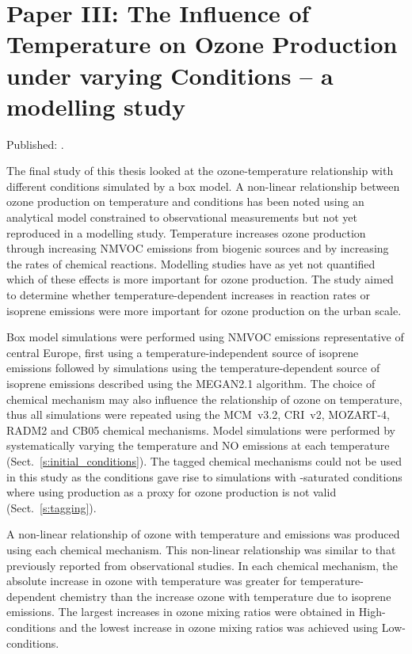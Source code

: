 \singlespacing
\section[Paper III]{Paper III: The Influence of Temperature on Ozone Production under varying  Conditions -- a modelling study} \label{s:T-O3_results}
\onehalfspacing

Published: .
\vspace{5mm}

The final study of this thesis looked at the ozone-temperature relationship with different  conditions simulated by a box model.
A non-linear relationship between ozone production on temperature and  conditions has been noted using an analytical model constrained to observational measurements but not yet reproduced in a modelling study.
Temperature increases ozone production through increasing NMVOC emissions from biogenic sources and by increasing the rates of chemical reactions.
Modelling studies have as yet not quantified which of these effects is more important for ozone production.
The study aimed to determine whether temperature-dependent increases in reaction rates or isoprene emissions were more important for ozone production on the urban scale.

Box model simulations were performed using NMVOC emissions representative of central Europe, first using a temperature-independent source of isoprene emissions followed by simulations using the temperature-dependent source of isoprene emissions described using the MEGAN2.1 algorithm.
The choice of chemical mechanism may also influence the relationship of ozone on temperature, thus all simulations were repeated using the MCM~v3.2, CRI~v2, MOZART-4, RADM2 and CB05 chemical mechanisms.
Model simulations were performed by systematically varying the temperature and NO emissions at each temperature (Sect.~\ref{s:initial_conditions}).
The tagged chemical mechanisms could not be used in this study as the  conditions gave rise to simulations with -saturated conditions where using  production as a proxy for ozone production is not valid (Sect.~\ref{s:tagging}).

A non-linear relationship of ozone with temperature and  emissions was produced using each chemical mechanism. 
This non-linear relationship was similar to that previously reported from observational studies.  
In each chemical mechanism, the absolute increase in ozone with temperature was greater for temperature-dependent chemistry than the increase ozone with temperature due to isoprene emissions.
The largest increases in ozone mixing ratios were obtained in High- conditions and the lowest increase in ozone mixing ratios was achieved using Low- conditions.

